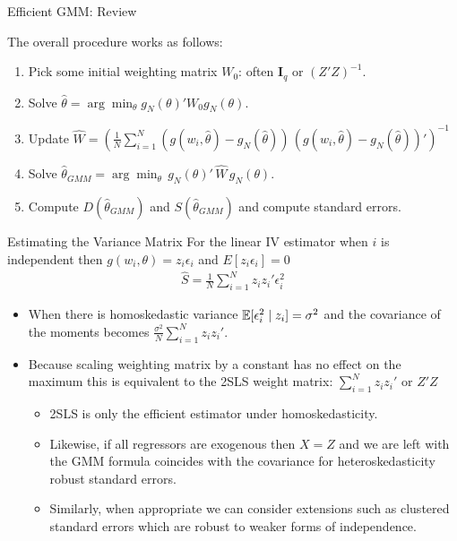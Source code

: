 \begin{frame}{Efficient GMM: Review}

\noindent The overall procedure works as follows:
\begin{enumerate}
\item Pick some initial weighting matrix $W_0$: often $\mathbf{I}_q$ or $(Z'Z)^{-1}$.
\item Solve $\hat{\theta} = \arg \min_{\theta} g_N(\theta)' W_0  g_N(\theta)$.
\item Update $\hat{W} = \left(\frac{1}{N} \sum_{i=1}^N (g(w_i,\hat{\theta}) - g_N(\hat{\theta}))  \, (g(w_i,\hat{\theta}) - g_N(\hat{\theta}))'\right)^{-1}$
\item Solve $\hat{\theta}_{GMM} = \arg \min_{\theta}\, g_N(\theta)' \, \hat{W} \, g_N(\theta)$.
\item Compute $D(\hat{\theta}_{GMM})$ and $S(\hat{\theta}_{GMM})$ and compute standard errors.
\end{enumerate}
\end{frame}

\begin{frame}{Estimating the Variance Matrix}
For the linear IV estimator when $i$ is independent then $g(w_i,\theta) = z_i \epsilon_i$ and $E[z_i \epsilon_i]=0$
\begin{eqnarray*}
\hat{S}=\frac{1}{N} \sum_{i=1}^N z_i z_i' \epsilon_i^2
\end{eqnarray*}
\begin{itemize}
\item When there is homoskedastic variance $\mathbb{E}[\epsilon_i^2 \mid z_i] = \sigma^2$ and the covariance of the moments becomes $\frac{\sigma^2}{N} \sum_{i=1}^N z_i z_i'$.
\item Because scaling weighting matrix by a constant has no effect on the maximum this is equivalent to the 2SLS weight matrix: $\sum_{i=1}^N z_i z_i'$ or $Z'Z$
\begin{itemize}
\item  2SLS is only the efficient estimator under \alert{homoskedasticity}.
\item  Likewise, if all regressors are exogenous then $X=Z$ and we are left with the GMM formula coincides with the covariance for heteroskedasticity robust standard errors.
\item Similarly, when appropriate we can consider extensions such as \alert{clustered standard errors} which are robust to weaker forms of independence.
\end{itemize}
\end{itemize}
\end{frame}

